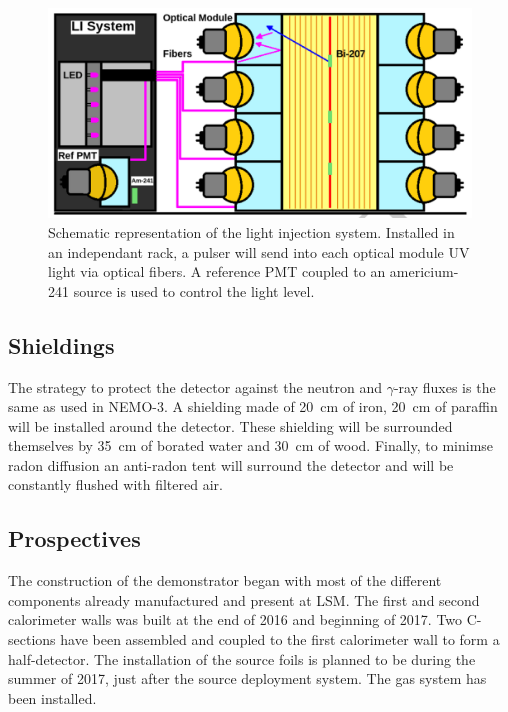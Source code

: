\documentclass[main.tex]{subfiles}
\begin{document}
\bigskip
\begin{figure}[h!]
\begin{center}
\includegraphics[scale=0.3]{pictures/Chap3/LIschema.png}
\caption{Schematic representation of the light injection system. Installed in an independant rack, a pulser will send into each optical module UV light via optical fibers. A reference PMT coupled to an americium-241 source is used to control the light level.}
\label{LIschema}
\end{center}
\end{figure}


\subsection{Shieldings}


\NI The strategy to protect the detector against the neutron and $\gamma$-ray fluxes is the same as used in NEMO-3. A shielding made of 20~cm of iron, 20~cm of paraffin will be installed around the detector. These shielding will be surrounded themselves by 35~cm of borated water and 30~cm of wood. Finally, to minimse radon diffusion an anti-radon tent will surround the detector and will be constantly flushed with filtered air.


\subsection{Prospectives}


\NI The construction of the demonstrator began with most of the different components already manufactured and present at LSM. The first and second calorimeter walls was built at the end of 2016 and beginning of 2017. Two C-sections have been assembled and coupled to the first calorimeter wall to form a half-detector. The installation of the source foils is planned to be during the summer of 2017, just after the source deployment system. The gas system has been installed.
\end{document}

